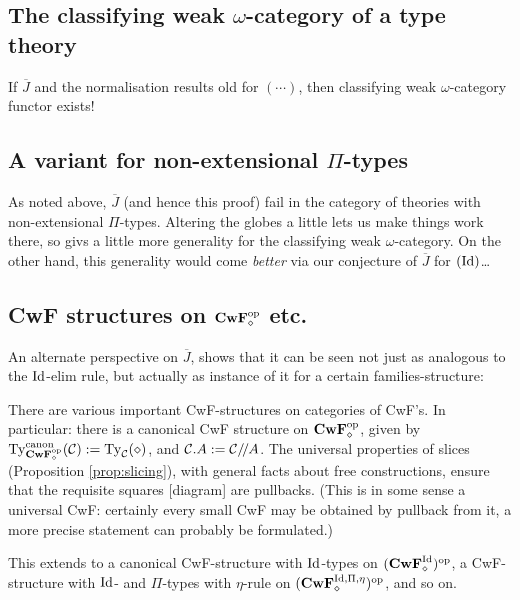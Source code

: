 \documentclass{amsart}
\newcommand{\Jbar}{\overline{J}}
\newcommand{\stuff}{{(\cdots)}}
\begin{document}
\subsection{The classifying weak $\omega$-category of a type theory}

\begin{corollary}If $\Jbar$ and the normalisation results old for $\stuff$, then classifying weak $\omega$-category functor exists!
\end{corollary}

\subsection{A variant for non-extensional $\Pi$-types}

As noted above, $\Jbar$ (and hence this proof) fail in the category of theories with non-extensional $\Pi$-types.  Altering the globes a little lets us make things work there, so givs a little more generality for the classifying weak $\omega$-category.  On the other hand, this generality would come \emph{better} via our conjecture of $\Jbar$ for $(\mathrm{Id})$\ldots

\subsection{CwF structures on $\mathbf{CwF}_\diamond^{\mathrm{op}}$ etc.}

An alternate perspective on $\Jbar$, shows that it can be seen not just as analogous to the $\mathrm{Id}$-elim rule, but actually as instance of it for a certain families-structure:

There are various important CwF-structures on categories of CwF's. In particular: there is a canonical CwF structure on $\mathbf{CwF}_\diamond^{\mathrm{op}}$, given by $\mathrm{Ty}^\mathrm{canon}_{\mathbf{CwF}_\diamond^{\mathrm{op}}}(\mathcal{C}) := \mathrm{Ty}_{\mathcal{C}}(\diamond)$, and $\mathcal{C}.A := \mathcal{C}/\!/A$.  The universal properties of slices (Proposition \ref{prop:slicing}), with general facts about free constructions, ensure that the requisite squares [diagram] are pullbacks.  (This is in some sense a universal CwF: certainly every small CwF may be obtained by pullback from it, a more precise statement can probably be formulated.)

This extends to a canonical CwF-structure with $\mathrm{Id}$-types on $(\mathbf{CwF}^{\mathrm{Id}}_\diamond)^{\mathrm{op}}$, a CwF-structure with $\mathrm{Id}$- and $\Pi$-types with $\eta$-rule on $(\mathbf{CwF}^{\mathrm{Id},\Pi,\eta}_\diamond)^{\mathrm{op}}$, and so on.
\end{document}
